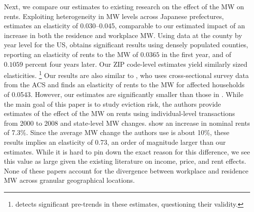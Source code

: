 Next, we compare our estimates to existing research on the effect of 
the MW on rents.
Exploiting heterogeneity in MW levels across Japanese prefectures,
\textcite{Yamagishi2021} estimates an elasticity of 0.030--0.045,
comparable to our estimated impact of an increase in both the residence and 
workplace MW.
Using data at the county by year level for the US, 
\textcite[][, Tables 1 and 2]{Yamagishi2019} obtains significant results 
using densely populated counties, reporting an elasticity of rents to the MW 
of $0.0365$ in the first year, and of $0.1059$ percent four years later.
Our ZIP code-level estimates yield similarly sized elasticities.%
\footnote{\textcite[][Table 3]{Yamagishi2019} detects significant pre-trends in
    these estimates, questioning their validity.} 
Our results are also similar to \textcite[][, Table 1]{Hughes2020}, who uses 
cross-sectional survey data from the ACS and finds an elasticity of rents to 
the MW for affected households of 0.0543.
However, our estimates are significantly smaller than those in 
\textcite{AgarwalEtAl2022}.
While the main goal of this paper is to study eviction risk, the authors 
provide estimates of the effect of the MW on rents using individual-level 
transactions from 2000 to 2008 and state-level MW changes.
\textcite[][, Section 5.1]{AgarwalEtAl2022} show an increase in nominal rents
of 7.3\%. 
Since the average MW change the authors use is about 10\%, these results implies 
an elasticity of 0.73, an order of magnitude larger than our estimates.
While it is hard to pin down the exact reason for this difference, we see this 
value as large given the existing literature on income, price, and rent effects.
None of these papers account for the divergence between workplace and residence
MW across granular geographical locations.
